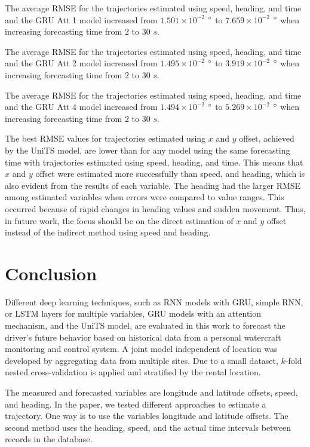 \documentclass[preprint,12pt]{elsarticle}
\begin{document}
The average RMSE for the trajectories estimated using speed, heading, and time and the GRU Att 1 model increased from $1.501 \times 10^{-2}$ $\degree$ to $7.659 \times 10^{-2}$ $\degree$ when increasing forecasting time from $2$ to $30$ $s$.

The average RMSE for the trajectories estimated using speed, heading, and time and the GRU Att 2 model increased from $1.495 \times 10^{-2}$ $\degree$ to $3.919 \times 10^{-2}$ $\degree$ when increasing forecasting time from $2$ to $30$ $s$.

The average RMSE for the trajectories estimated using speed, heading, and time and the GRU Att 4 model increased from $1.494 \times 10^{-2}$ $\degree$ to $5.269 \times 10^{-2}$ $\degree$ when increasing forecasting time from $2$ to $30$ $s$.

The best RMSE values for trajectories estimated using $x$ and $y$ offset, achieved by the UniTS model, are lower than for any model using the same forecasting time with trajectories estimated using speed, heading, and time. This means that $x$ and $y$ offset were estimated more successfully than speed, and heading, which is also evident from the results of each variable. The heading had the larger RMSE among estimated variables when errors were compared to value ranges. This occurred because of rapid changes in heading values and sudden movement. Thus, in future work, the focus should be on the direct estimation of $x$ and $y$ offset instead of the indirect method using speed and heading.

\section{Conclusion}
\label{sec:Conclusion}

Different deep learning techniques, such as RNN models with GRU, simple RNN, or LSTM layers for multiple variables, GRU models with an attention mechanism, and the UniTS model, are evaluated in this work to forecast the driver's future behavior based on historical data from a personal watercraft monitoring and control system.  A joint model independent of location was developed by aggregating data from multiple sites. Due to a small dataset, $k$-fold nested cross-validation is applied and stratified by the rental location.

The measured and forecasted variables are longitude and latitude offsets, speed, and heading. In the paper, we tested different approaches to estimate a trajectory. One way is to use the variables longitude and latitude offsets. The second method uses the heading, speed, and the actual time intervals between records in the database.
\end{document}

